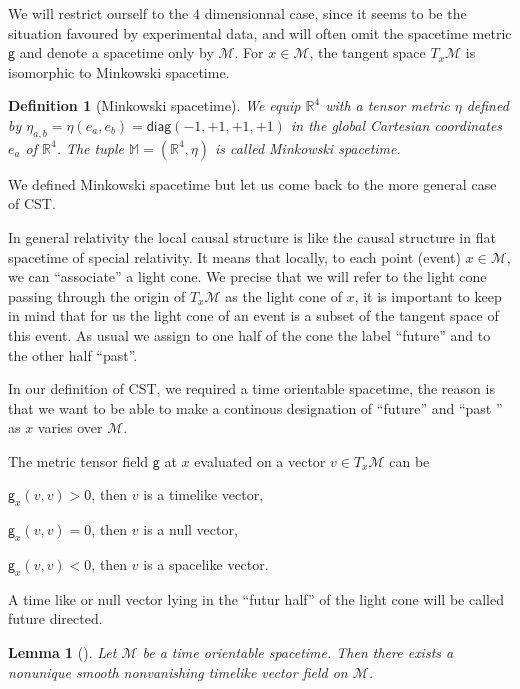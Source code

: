 \documentclass[11pt]{book}
\newcommand{\Mcal}{\mathcal{M}}
\newcommand{\Mbb}{\mathbb{M}}
\newcommand{\Rbb}{\mathbb{R}}
\newcommand{\gsf}{\mathsf{g}}
\theoremstyle{break}
\newtheorem{lemma}{Lemma}
\newtheorem{definition}{Definition}
\begin{document}
We will restrict ourself to the $4$ dimensionnal case, since it seems to be the situation favoured by experimental data, and will often omit the spacetime metric $\gsf$ and denote a spacetime only by $\Mcal$. For $x\in\Mcal$, the tangent space $T_x\Mcal$ is isomorphic to Minkowski spacetime. \par

\begin{definition}[Minkowski spacetime]
We equip $\Rbb^4$ with a tensor metric $\eta$ defined by $\eta_{a,b} = \eta(e_a,e_b) = \mathsf{diag}(-1,+1,+1,+1)$ in the global Cartesian coordinates $e_a$ of $\Rbb^4$. The tuple $\Mbb = \left(\Rbb^4,\eta\right)$ is called Minkowski spacetime. 
\end{definition}

We defined Minkowski spacetime but let us come back to the more general case of CST. \par

In general relativity the local causal structure is like the causal structure in flat spacetime of special relativity. It means that locally, to each point (event) $x\in\Mcal$, we can ``associate'' a light cone. We precise that we will refer to the light cone passing through the origin of $T_x\Mcal$ as the light cone of $x$, it is important to keep in mind that for us the light cone of an event is a subset of the tangent space of this event.
As usual we assign to one half of the cone the label ``future'' and to the other half ``past''. \par

In our definition of CST, we required a time orientable spacetime, the reason is that we want to be able to make a continous designation of ``future'' and ``past '' as $x$ varies over $\Mcal$. \par

The metric tensor field $\gsf$ at $x$ evaluated on a vector $v \in T_x\Mcal$ can be
\begin{description}
 \item $\gsf_x(v,v) > 0$, then $v$ is a timelike vector,
 \item $\gsf_x(v,v) = 0$, then $v$ is a null vector,
 \item $\gsf_x(v,v) < 0$, then $v$ is a spacelike vector.
\end{description}
A time like or null vector lying in the ``futur half'' of the light cone will be called future directed.

\begin{lemma}[]
Let $\Mcal$ be a time orientable spacetime. Then there exists a nonunique smooth nonvanishing timelike vector field on $\Mcal$.
\end{lemma}
\end{document}
